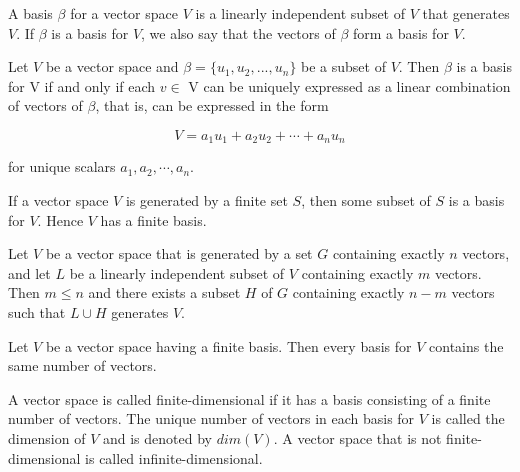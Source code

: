 %


\begin{defn}[Basis]
A basis $\beta$ for a vector space $V$ is a linearly independent subset of $V$ that generates $V$. If $\beta$ is a basis for $V$, we also say that the vectors of $\beta$ form a basis for $V$.
		
\end{defn}

\begin{thm} %
	Let $V$ be a vector space and $\beta = \{u_1,u_2,...,u_n \}$ be a subset of $V$. Then $\beta$ is a basis for V if and only if each  $v\in$ V can be uniquely expressed as a linear combination of vectors of $\beta$, that is, can be expressed in the form

	$$ V = a_1u_1 + a_2u_2 + \cdots+ a_nu_n $$

for unique scalars $a_1, a_2, \cdots , a_n$.	
\end{thm}




\begin{thm} %
	If a vector space $V$ is generated by a finite set $S$, then some subset of $S$ is a basis for $V$. Hence $V$ has a finite basis.	
\end{thm}




\begin{thm} %
	Let $V$ be a vector space that is generated by a set $G$ containing exactly $n$ vectors, and let $L$ be a linearly independent subset of $V$ containing exactly $m$ vectors. Then $m \leq n$ and there exists a subset $H$ of $G$ containing exactly $n - m$ vectors such that $L \cup H$ generates $V$.
\end{thm}




\begin{cor} %
	Let $V$ be a vector space having a finite basis. Then every basis for $V$ contains the same number of vectors.	
\end{cor}

%

\begin{defn}
	A vector space is called finite-dimensional if it has a basis consisting of a finite number of vectors. The unique number of vectors
 in each basis for $V$ is called the dimension of $V$ and is denoted by $dim(V)$.
A vector space that is not finite-dimensional is called infinite-dimensional.
\end{defn}



